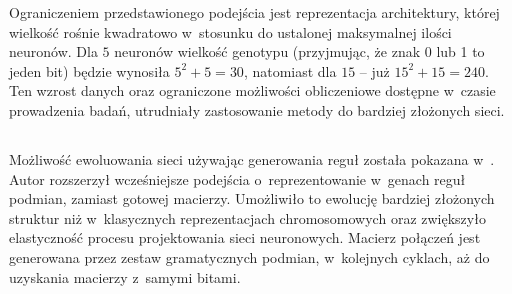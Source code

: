 Ograniczeniem przedstawionego podejścia jest
reprezentacja architektury,
której wielkość rośnie kwadratowo
w~stosunku do ustalonej
maksymalnej ilości neuronów.
Dla $5$ neuronów wielkość genotypu
(przyjmując, że znak 0 lub 1 to jeden bit)
będzie wynosiła $5^2+5=30$, natomiast
dla $15$ -- już $15^2+15=240$.
Ten wzrost danych oraz ograniczone możliwości
obliczeniowe dostępne w~czasie prowadzenia badań,
utrudniały zastosowanie metody
do bardziej złożonych sieci.

\tocless\subsection{}
Możliwość ewoluowania sieci używając
generowania reguł została pokazana
w~.
Autor rozszerzył wcześniejsze podejścia
o~reprezentowanie w~genach reguł podmian,
zamiast gotowej macierzy.
Umożliwiło to ewolucję bardziej złożonych struktur
niż w~klasycznych reprezentacjach chromosomowych
oraz zwiększyło elastyczność procesu
projektowania sieci neuronowych.
Macierz połączeń jest generowana
przez zestaw gramatycznych podmian,
w~kolejnych cyklach,
aż do uzyskania macierzy z~samymi
bit{\textquotesingle}ami.
